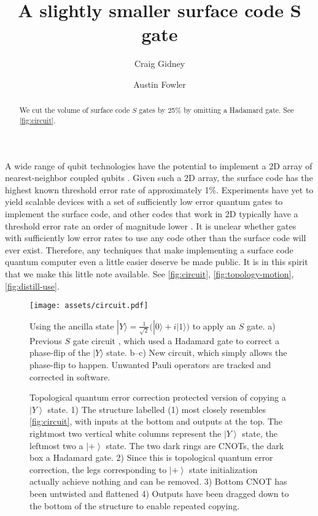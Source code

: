 \documentclass[twocolumn,longbibliography]{quantumarticle-customized}
\title{A slightly smaller surface code S gate}
\author{Craig Gidney}
\affiliation{Google, Santa Barbara, CA 93117, USA}
\author{Austin Fowler}
\affiliation{Google, Santa Barbara, CA 93117, USA}
\newcommand{\ket}[1]{\left|#1\right\rangle}
\begin{document}
\maketitle

\begin{abstract}
We cut the volume of surface code $S$ gates by 25\% by omitting a Hadamard gate.
See \autoref{fig:circuit}.
\end{abstract}

A wide range of qubit technologies have the potential to implement a 2D array of nearest-neighbor coupled qubits \cite{Bare13,Gamb17,Leik17,Schl11,Laht17}.
Given such a 2D array, the surface code \cite{Brav98,Denn02,Raus07,Raus07d,Fowl12f} has the highest known threshold error rate of approximately 1\%.
Experiments have yet to yield scalable devices with a set of sufficiently low error quantum gates to implement the surface code, and other codes that work in 2D typically have a threshold error rate an order of magnitude lower \cite{Wang09b}.
It is unclear whether gates with sufficiently low error rates to use any code other than the surface code will ever exist.
Therefore, any techniques that make implementing a surface code quantum computer even a little easier deserve be made public.
It is in this spirit that we make this little note available.
See \autoref{fig:circuit}, \autoref{fig:topology-motion}, \autoref{fig:distill-use}.

\begin{figure}[H]
  \centering
  \texttt{[image: assets/circuit.pdf]}
  \caption{
    Using the ancilla state $|Y\rangle = \frac{1}{\sqrt 2} \big( |0\rangle + i |1\rangle \big)$ to apply an $S$ gate.
    a) Previous $S$ gate circuit \cite{Alif06}, which used a Hadamard gate to correct a phase-flip of the $|Y\rangle$ state.
    b--c) New circuit, which simply allows the phase-flip to happen.
    Unwanted Pauli operators are tracked and corrected in software.
  }
  \label{fig:circuit}
\end{figure}

\begin{figure*}
  \centering
  \caption{
    Topological quantum error correction protected version of copying a $\ket{Y}$ state.
    1) The structure labelled (1) most closely resembles \autoref{fig:circuit}, with inputs at the bottom and outputs at the top.
    The rightmost two vertical white columns represent the $\ket{Y}$ state, the leftmost two a $\ket{+}$ state.
    The two dark rings are CNOTs, the dark box a Hadamard gate.
    2) Since this is topological quantum error correction, the legs corresponding to $\ket{+}$ state initialization actually achieve nothing and can be removed.
    3) Bottom CNOT has been untwisted and flattened
    4) Outputs have been dragged down to the bottom of the structure to enable repeated copying.
  }
  \label{fig:topology-motion}
\end{figure*}
\end{document}
